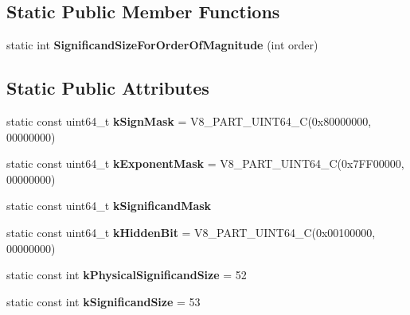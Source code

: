 \subsection*{Static Public Member Functions}
\begin{DoxyCompactItemize}
\item 
static int {\bfseries Significand\+Size\+For\+Order\+Of\+Magnitude} (int order)\hypertarget{classv8_1_1internal_1_1_double_a8ac372d485499fb0e73db067852254c9}{}\label{classv8_1_1internal_1_1_double_a8ac372d485499fb0e73db067852254c9}

\end{DoxyCompactItemize}
\subsection*{Static Public Attributes}
\begin{DoxyCompactItemize}
\item 
static const uint64\+\_\+t {\bfseries k\+Sign\+Mask} = V8\+\_\+P\+A\+R\+T\+\_\+\+U\+I\+N\+T64\+\_\+C(0x80000000, 00000000)\hypertarget{classv8_1_1internal_1_1_double_a2a622add63c0f1bd18fee16bfa4da795}{}\label{classv8_1_1internal_1_1_double_a2a622add63c0f1bd18fee16bfa4da795}

\item 
static const uint64\+\_\+t {\bfseries k\+Exponent\+Mask} = V8\+\_\+P\+A\+R\+T\+\_\+\+U\+I\+N\+T64\+\_\+C(0x7\+F\+F00000, 00000000)\hypertarget{classv8_1_1internal_1_1_double_a9bc757b9cbafdf3183528389566cd821}{}\label{classv8_1_1internal_1_1_double_a9bc757b9cbafdf3183528389566cd821}

\item 
static const uint64\+\_\+t {\bfseries k\+Significand\+Mask}
\item 
static const uint64\+\_\+t {\bfseries k\+Hidden\+Bit} = V8\+\_\+P\+A\+R\+T\+\_\+\+U\+I\+N\+T64\+\_\+C(0x00100000, 00000000)\hypertarget{classv8_1_1internal_1_1_double_ab15f4c1adda942586c7cbe1d6fcc3a1e}{}\label{classv8_1_1internal_1_1_double_ab15f4c1adda942586c7cbe1d6fcc3a1e}

\item 
static const int {\bfseries k\+Physical\+Significand\+Size} = 52\hypertarget{classv8_1_1internal_1_1_double_af1de6a87841d6548de222fa61d0c2628}{}\label{classv8_1_1internal_1_1_double_af1de6a87841d6548de222fa61d0c2628}

\item 
static const int {\bfseries k\+Significand\+Size} = 53\hypertarget{classv8_1_1internal_1_1_double_acc8c3c2f7019f20ae83771473d2c7547}{}\label{classv8_1_1internal_1_1_double_acc8c3c2f7019f20ae83771473d2c7547}

\end{DoxyCompactItemize}
